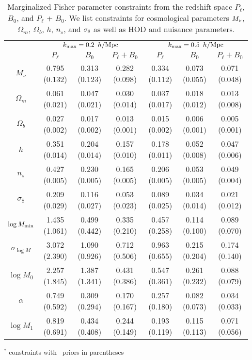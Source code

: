 \begin{table}
    \caption{Marginalized Fisher parameter constraints from the redshift-space 
    $P_\ell$, $B_0$, and $P_\ell$ + $B_0$. We list constraints for cosmological 
    parameters $M_\nu$, $\Omega_m$, $\Omega_b$, $h$, $n_s$, and $\sigma_8$ as well 
    as HOD and nuisance parameters.} 
\begin{center} 
    \begin{tabular}{c|ccc|ccc} \hline
        & \multicolumn{3}{c}{$k_{\rm max}=0.2~\,h/\mathrm{Mpc}$} & \multicolumn{3}{c}{$k_{\rm max}=0.5~\,h/\mathrm{Mpc}$} \\ %
        & $P_\ell$ & $B_0$ & $P_\ell + B_0$ & $P_\ell$ & $B_0$ & $P_\ell + B_0$ \\[3pt] \hline 
$M_\nu$     &  0.795 (0.132) & 0.313 (0.123) & 0.282 (0.098) & 0.334 (0.112) & 0.073 (0.055) & 0.071 (0.048)  \\
$\Omega_m$  &  0.061 (0.021) & 0.047 (0.021) & 0.030 (0.014) & 0.037 (0.017) & 0.018 (0.012) & 0.013 (0.008)  \\
$\Omega_b$  &  0.027 (0.002) & 0.017 (0.002) & 0.013 (0.001) & 0.015 (0.002) & 0.006 (0.001) & 0.005 (0.001)  \\
$h$         &  0.351 (0.014) & 0.204 (0.014) & 0.157 (0.010) & 0.178 (0.011) & 0.052 (0.008) & 0.047 (0.006)  \\
$n_s$       &  0.427 (0.005) & 0.230 (0.005) & 0.165 (0.005) & 0.206 (0.005) & 0.053 (0.005) & 0.049 (0.004)  \\
$\sigma_8$  &  0.209 (0.029) & 0.116 (0.027) & 0.053 (0.023) & 0.089 (0.025) & 0.034 (0.014) & 0.021 (0.012)  \\ [3pt] \hline
$\log M_{\rm min}$ &  1.435 (1.061) & 0.499 (0.442) & 0.335 (0.210) & 0.457 (0.258) & 0.114 (0.100) & 0.089 (0.070)  \\
$\sigma_{\log M}$ &  3.072 (2.390) & 1.090 (0.926) & 0.712 (0.506) & 0.963 (0.655) & 0.215 (0.204) & 0.174 (0.140)  \\
$\log M_0$ &  2.257 (1.845) & 1.387 (1.341) & 0.431 (0.386) & 0.547 (0.361) & 0.261 (0.232) & 0.088 (0.079)  \\
$\alpha$ &  0.749 (0.592) & 0.309 (0.294) & 0.170 (0.167) & 0.257 (0.180) & 0.082 (0.073) & 0.034 (0.033)  \\
$\log M_1$ &  0.819 (0.691) & 0.434 (0.408) & 0.244 (0.149) & 0.193 (0.119) & 0.115 (0.113) & 0.071 (0.056)  \\
        [3pt]
\hline                                 
\end{tabular} \label{tab:forecast}
\end{center}
{$^*$ constraints with \planck~priors in parentheses}
\end{table}

